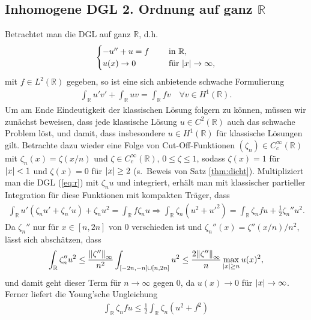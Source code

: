 \documentclass[twoside]{article}
\theoremstyle{definition}
\begin{document}
\subsection{Inhomogene DGL 2. Ordnung auf ganz $\mathbb{R}$}
Betrachtet man die DGL auf ganz $\mathbb{R}$, d.h.\
\begin{align}
\begin{cases}
-u'' + u = f &\quad \text{ in } \mathbb{R},\\
u(x) \to 0 &\quad \text{ für } \abs{x} \to \infty,
\end{cases} \label{eq:r}
\end{align}
mit $f \in L^2(\mathbb{R})$ gegeben, so ist eine sich anbietende schwache Formulierung
\begin{align*}
\int_\mathbb{R} u' v'  + \int_\mathbb{R} uv = \int_\mathbb{R} fv \quad \forall v \in H^1(\mathbb{R}).
\end{align*}
Um am Ende Eindeutigkeit der klassischen Lösung folgern zu können, müssen wir zunächst beweisen, dass jede klassische Lösung $u \in C^2(\mathbb{R})$ auch das schwache Problem löst, und damit, dass insbesondere $u \in H^1(\mathbb{R})$ für klassische Lösungen gilt. Betrachte dazu wieder eine Folge von Cut-Off-Funktionen $(\zeta_n) \in C_c^\infty(\mathbb{R})$ mit $\zeta_n(x) = \zeta(x/n)$ und $\zeta \in C_c^\infty(\mathbb{R})$, $0 \leq \zeta \leq 1$, sodass $\zeta(x)=1$ für $\abs{x} < 1$ und $\zeta(x) = 0$ für $\abs{x} \geq 2$ (s.\ Beweis von Satz \ref{thm:dicht}). Multipliziert man die DGL (\ref{eq:r}) mit $\zeta_n u$ und integriert, erhält man mit klassischer partieller Integration für diese Funktionen mit kompakten Träger, dass
\begin{align*}
\int_\mathbb{R} u'(\zeta_n u' + \zeta_n' u) +  \zeta_n u^2 = \int_\mathbb{R} f\zeta_nu \Rightarrow \int_\mathbb{R} \zeta_n (u^2+u'^2) = \int_\mathbb{R} \zeta_n fu + \frac{1}{2}\zeta_n '' u^2.
\end{align*}
Da $\zeta_n''$ nur für $x \in [n,2n]$ von 0 verschieden ist und $\zeta_n''(x)=\zeta''(x/n)/n^2$, lässt sich abschätzen, dass 
\begin{align*}
\int_\mathbb{R} \zeta_n'' u^2 \leq \frac{\norm{\zeta''}_\infty}{n^2} \int_{[-2n,-n]\cup[n,2n]} u^2 \leq \frac{2 \norm{\zeta''}_\infty}{n} \max_{\abs{x} \geq n} u(x)^2,
\end{align*}
und damit geht dieser Term für $n \to \infty$ gegen $0$, da $u(x) \to 0$ für $\abs{x} \to \infty$. Ferner liefert die Young'sche Ungleichung
\begin{align*}
 \int_\mathbb{R} \zeta_n fu \leq \frac{1}{2} \int_\mathbb{R} \zeta_n (u^2+f^2)
\end{align*}
\end{document}
